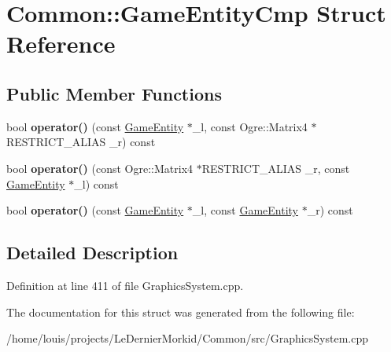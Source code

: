 \hypertarget{struct_common_1_1_game_entity_cmp}{}\section{Common\+:\+:Game\+Entity\+Cmp Struct Reference}
\label{struct_common_1_1_game_entity_cmp}
\subsection*{Public Member Functions}
\begin{DoxyCompactItemize}
\item 
\mbox{\label{struct_common_1_1_game_entity_cmp_ab4e0547cba2304e3eefe3e6568df678d}} 
bool {\bfseries operator()} (const \hyperlink{struct_common_1_1_game_entity}{Game\+Entity} $\ast$\+\_\+l, const Ogre\+::\+Matrix4 $\ast$R\+E\+S\+T\+R\+I\+C\+T\+\_\+\+A\+L\+I\+AS \+\_\+r) const
\item 
\mbox{\label{struct_common_1_1_game_entity_cmp_acc6e1674ddc34ae8992b38c9a2b04e31}} 
bool {\bfseries operator()} (const Ogre\+::\+Matrix4 $\ast$R\+E\+S\+T\+R\+I\+C\+T\+\_\+\+A\+L\+I\+AS \+\_\+r, const \hyperlink{struct_common_1_1_game_entity}{Game\+Entity} $\ast$\+\_\+l) const
\item 
\mbox{\label{struct_common_1_1_game_entity_cmp_adb326666aef6ac6279d3d11eb679ceee}} 
bool {\bfseries operator()} (const \hyperlink{struct_common_1_1_game_entity}{Game\+Entity} $\ast$\+\_\+l, const \hyperlink{struct_common_1_1_game_entity}{Game\+Entity} $\ast$\+\_\+r) const
\end{DoxyCompactItemize}


\subsection{Detailed Description}


Definition at line 411 of file Graphics\+System.\+cpp.



The documentation for this struct was generated from the following file\+:\begin{DoxyCompactItemize}
\item 
/home/louis/projects/\+Le\+Dernier\+Morkid/\+Common/src/Graphics\+System.\+cpp\end{DoxyCompactItemize}
